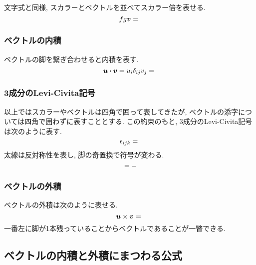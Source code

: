 \documentclass[dvipdfmx]{jsarticle}
\begin{document}
文字式と同様, スカラーとベクトルを並べてスカラー倍を表せる.
\begin{equation*}
    fg\bm{v}
    =
    \vcenter{\hbox{}}
\end{equation*}


\subsubsection{ベクトルの内積}

ベクトルの脚を繋ぎ合わせると内積を表す.
\begin{equation*}
    \bm{u\cdot v}=u_i\delta_{ij}v_j
    =
    \vcenter{\hbox{}}
\end{equation*}


\subsubsection{3成分のLevi-Civita記号}
\label{sec: vector: 3 components levicivita}

以上ではスカラーやベクトルは四角で囲って表してきたが, ベクトルの添字については四角で囲わずに表すこととする.
この約束のもと, 3成分のLevi-Civita記号は次のように表す.
\begin{equation*}
    \epsilon_{ijk}
    =
    \vcenter{\hbox{}}
\end{equation*}
太線は反対称性を表し, 脚の奇置換で符号が変わる.
\begin{equation*}
    \vcenter{\hbox{}}
    =
    -\vcenter{\hbox{}}
\end{equation*}


\subsubsection{ベクトルの外積}

ベクトルの外積は次のように表せる.
\begin{equation*}
    \bm{u}\times\bm{v}
    =
    \vcenter{\hbox{}}
\end{equation*}
一番左に脚が1本残っていることからベクトルであることが一瞥できる.



\subsection{ベクトルの内積と外積にまつわる公式}
\end{document}
